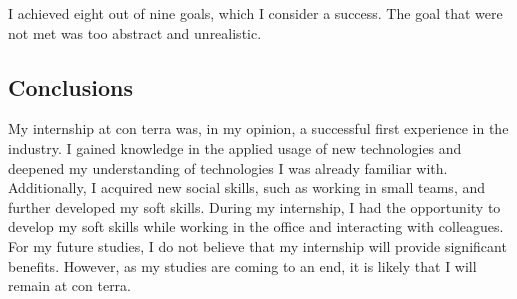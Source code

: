 \documentclass[11pt, titlepage, a4paper]{article}
\begin{document}
I achieved eight out of nine goals, which I  consider a success. The goal that were not met was too abstract and unrealistic. %

\subsection{Conclusions}

My internship at con terra was, in my opinion, a successful first experience in the industry. I gained knowledge in the applied usage of new technologies and deepened my understanding of technologies I was already familiar with. Additionally, I acquired new social skills, such as working in small teams, and further developed my soft skills. During my internship, I had the opportunity to develop my soft skills while working in the office and interacting with colleagues.
For my future studies, I do not believe that my internship will provide significant benefits. However, as my studies are coming to an end, it is likely that I will remain at con terra.

\clearpage
\end{document}

